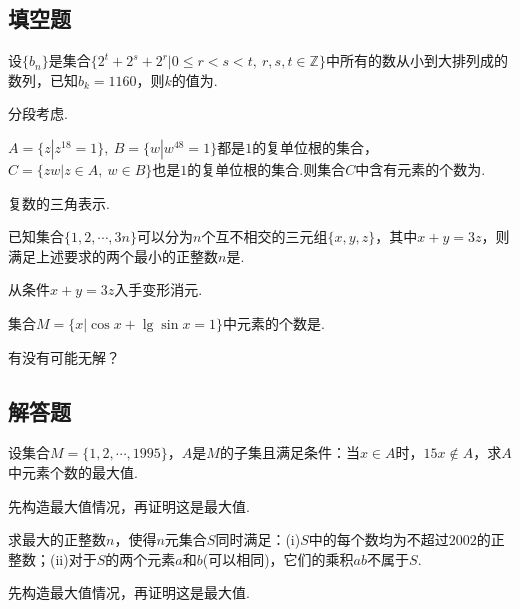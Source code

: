 \documentclass[lang=cn, zihao=4.5]{elegantbook}
\newcommand{\tk}{\uline{\hspace{4em}}}
\begin{document}
\subsection*{填空题}

\begin{example} %
	设$\{ b_n \}$是集合$\{ 2^t+2^s+2^r | 0 \leq r < s < t, ~r,s,t \in \mathbb{Z} \}$中所有的数从小到大排列成的数列，已知$b_k = 1160$，则$k$的值为\tk .
\end{example}
\begin{hint}
	分段考虑.
\end{hint}

\begin{example} %
	$A=\{ z|z^{18}=1 \},~ B=\{ w|w^{48}=1 \}$都是$1$的复单位根的集合，$C=\{ zw|z \in A,~ w \in B \}$也是$1$的复单位根的集合.则集合$C$中含有元素的个数为\tk .
\end{example}
\begin{hint}
	复数的三角表示.
\end{hint}

\begin{example} %
	已知集合$\{ 1,2, \cdots ,3n \}$可以分为$n$个互不相交的三元组$\{ x,y,z \}$，其中$x+y=3z$，则满足上述要求的两个最小的正整数$n$是\tk .
\end{example}
\begin{hint}
	从条件$x+y=3z$入手变形消元.
\end{hint}

\begin{example} %
	集合$M= \{ x|\cos{x} + \lg \sin{x} = 1 \}$中元素的个数是\tk .
\end{example}
\begin{hint}
	有没有可能无解？
\end{hint}

\subsection*{解答题}

\begin{example} %
	设集合$M = \{ 1,2, \cdots ,1995 \}$，$A$是$M$的子集且满足条件：当$x \in A$时，$15x \notin A$，求$A$中元素个数的最大值.
\end{example}
\begin{hint}
	先构造最大值情况，再证明这是最大值.
\end{hint}

\begin{example} %
	求最大的正整数$n$，使得$n$元集合$S$同时满足：(i)$S$中的每个数均为不超过$2002$的正整数；(ii)对于$S$的两个元素$a$和$b$(可以相同)，它们的乘积$ab$不属于$S$.
\end{example}
\begin{hint}
	先构造最大值情况，再证明这是最大值.
\end{hint}
\end{document}
